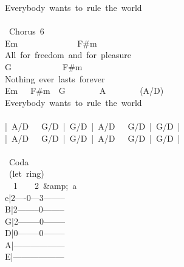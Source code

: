 {Everybody\ wants\ to\ rule\ the\ world\\
\\
\lbrack\ Chorus\ 6\rbrack\\
Em\ \ \ \ \ \ \ \ \ \ \ \ \ \ F\#m\\
All\ for\ freedom\ and\ for\ pleasure\\
G\ \ \ \ \ \ \ \ \ \ \ \ F\#m\\
Nothing\ ever\ lasts\ forever\\
Em\ \ \ F\#m\ \ G\ \ \ \ \ \ \ \ A\ \ \ \ \ \ \ \ (A/D)\\
Everybody\ wants\ to\ rule\ the\ world\\
\\
|\ A/D\ \ \ G/D\ |\ G/D\ |\ A/D\ \ \ G/D\ |\ G/D\ |\\
|\ A/D\ \ \ G/D\ |\ G/D\ |\ A/D\ \ \ G/D\ |\ G/D\ |\\
\\
\lbrack\ Coda\rbrack\\
\ (let\ ring)\\
\ \ 1\ \ \ \ 2\ \&amp;\ a\\
e|2----0---3--------\\
B|2--------0--------\\
G|2--------0--------\\
D|0--------0--------\\
A|------------------\\
E|------------------}
